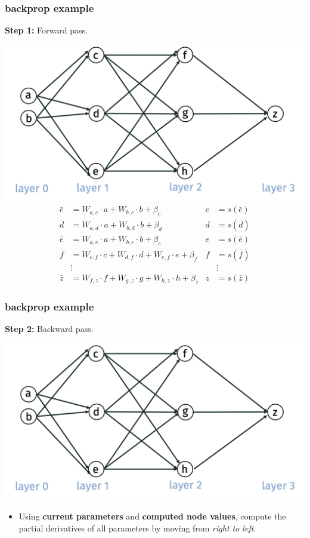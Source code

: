 \documentclass[handout,compress]{beamer}
\begin{document}
	\begin{frame}[t]
		\frametitle{backprop example}
		\small
		\textbf{Step 1:} Forward pass. 
		
		\includegraphics[width=.5\textwidth]{no_select.png}
		\begin{align*}
		\bar{c} &= W_{a,c}\cdot a + W_{b,c}\cdot b + \beta_c & c&= s(\bar{c})\\
		\bar{d} &= W_{a,d}\cdot a + W_{b,d}\cdot b + \beta_d & d&= s(\bar{d})\\
		\bar{e} &= W_{a,e}\cdot a + W_{b,e}\cdot b + \beta_e & e&= s(\bar{e})\\
		\bar{f} &= W_{c,f}\cdot c + W_{d,f}\cdot d + W_{e,f}\cdot e + \beta_f & f&= s(\bar{f})
		\\
		&\vdots & &\vdots\\
		\bar{z} &= W_{f,z}\cdot f + W_{g,z}\cdot g + W_{h,z}\cdot h + \beta_z & z&= s(\bar{z})
		\end{align*}
	\end{frame}
	
	\begin{frame}
		\frametitle{backprop example}
		\textbf{Step 2:} Backward pass. 
		\begin{center}
			\vspace{-.5em}
			\includegraphics[width=.6\textwidth]{no_select.png}
			\vspace{-1em}
		\end{center}
		\begin{itemize}
			\item Using \textbf{current parameters} and \textbf{computed node values}, compute the partial derivatives of all parameters by moving from \emph{right to left}.
		\end{itemize}	
	\end{frame}
	
\end{document}
